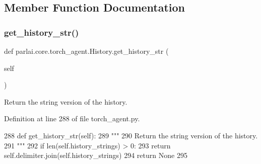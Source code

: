 \subsection{Member Function Documentation}
\mbox{\label{classparlai_1_1core_1_1torch__agent_1_1History_a29576ee0dd27b8ee5e651297dada3131}} 
\subsubsection{\texorpdfstring{get\+\_\+history\+\_\+str()}{get\_history\_str()}}
{\footnotesize\ttfamily def parlai.\+core.\+torch\+\_\+agent.\+History.\+get\+\_\+history\+\_\+str (\begin{DoxyParamCaption}\item[{}]{self }\end{DoxyParamCaption})}

\begin{DoxyVerb}Return the string version of the history.
\end{DoxyVerb}
 

Definition at line 288 of file torch\+\_\+agent.\+py.


\begin{DoxyCode}
288     \textcolor{keyword}{def }get\_history\_str(self):
289         \textcolor{stringliteral}{"""}
290 \textcolor{stringliteral}{        Return the string version of the history.}
291 \textcolor{stringliteral}{        """}
292         \textcolor{keywordflow}{if} len(self.history\_strings) > 0:
293             \textcolor{keywordflow}{return} self.delimiter.join(self.history\_strings)
294         \textcolor{keywordflow}{return} \textcolor{keywordtype}{None}
295 
\end{DoxyCode}
\mbox{\label{classparlai_1_1core_1_1torch__agent_1_1History_a0d9c7a847af118f77e9986279acf7dea}} 
